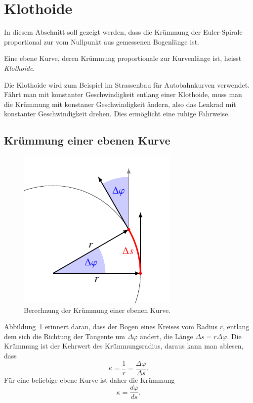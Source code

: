 %
%
%
\section{Klothoide
\label{fresnel:section:klothoide}}
In diesem Abschnitt soll gezeigt werden, dass die Krümmung der 
Euler-Spirale proportional zur vom Nullpunkt aus gemessenen Bogenlänge
ist.

\begin{definition}
Eine ebene Kurve, deren Krümmung proportionale zur Kurvenlänge ist,
heisst {\em Klothoide}.
\end{definition}

Die Klothoide wird zum Beispiel im Strassenbau für Autobahnkurven
verwendet.
Fährt man mit konstanter Geschwindigkeit entlang einer Klothoide,
muss man die Krümmung mit konstaner Geschwindigkeit ändern,
also das Lenkrad mit konstanter Geschwindigkeit drehen.
Dies ermöglicht eine ruhige Fahrweise.

\subsection{Krümmung einer ebenen Kurve}
\begin{figure}
\centering
\includegraphics{papers/fresnel/images/kruemmung.pdf}
\caption{Berechnung der Krümmung einer ebenen Kurve.
\label{fresnel:figure:kruemmung}}
\end{figure}
Abbildung~\ref{fresnel:figure:kruemmung} erinnert daran, dass der
Bogen eines Kreises vom Radius $r$, entlang dem sich die Richtung
der Tangente um $\Delta\varphi$ ändert, die Länge
$\Delta s = r\Delta\varphi$.
Die Krümmung ist der Kehrwert des Krümmungsradius, daraus kann
man ablesen, dass 
\[
\kappa = \frac{1}{r} = \frac{\Delta \varphi}{\Delta s}.
\]
Für eine beliebige ebene Kurve ist daher die Krümmung
\[
\kappa = \frac{d\varphi}{ds}.
\]

